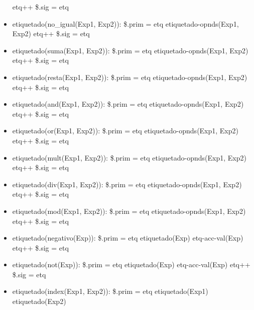 \documentclass[11pt]{article}
\begin{document}
\begin{itemize}
            \subitem etq++
            \subitem \$.sig = etq
        \item etiquetado(no\_igual(Exp1, Exp2)): 
            \subitem \$.prim = etq
            \subitem etiquetado-opnds(Exp1, Exp2)
            \subitem etq++
            \subitem \$.sig = etq
        \item etiquetado(suma(Exp1, Exp2)): 
            \subitem \$.prim = etq
            \subitem etiquetado-opnds(Exp1, Exp2)
            \subitem etq++
            \subitem \$.sig = etq
        \item etiquetado(resta(Exp1, Exp2)): 
            \subitem \$.prim = etq
            \subitem etiquetado-opnds(Exp1, Exp2)
            \subitem etq++
            \subitem \$.sig = etq
        \item etiquetado(and(Exp1, Exp2)): 
            \subitem \$.prim = etq
            \subitem etiquetado-opnds(Exp1, Exp2)
            \subitem etq++
            \subitem \$.sig = etq
        \item etiquetado(or(Exp1, Exp2)): 
            \subitem \$.prim = etq
            \subitem etiquetado-opnds(Exp1, Exp2)
            \subitem etq++
            \subitem \$.sig = etq
        \item etiquetado(mult(Exp1, Exp2)): 
            \subitem \$.prim = etq
            \subitem etiquetado-opnds(Exp1, Exp2)
            \subitem etq++
            \subitem \$.sig = etq
        \item etiquetado(div(Exp1, Exp2)): 
            \subitem \$.prim = etq
            \subitem etiquetado-opnds(Exp1, Exp2)
            \subitem etq++
            \subitem \$.sig = etq
        \item etiquetado(mod(Exp1, Exp2)): 
            \subitem \$.prim = etq
            \subitem etiquetado-opnds(Exp1, Exp2)
            \subitem etq++
            \subitem \$.sig = etq
        \item etiquetado(negativo(Exp)): 
            \subitem \$.prim = etq
            \subitem etiquetado(Exp)
            \subitem etq-acc-val(Exp)
            \subitem etq++
            \subitem \$.sig = etq
        \item etiquetado(not(Exp)): 
            \subitem \$.prim = etq
            \subitem etiquetado(Exp)
            \subitem etq-acc-val(Exp)
            \subitem etq++
            \subitem \$.sig = etq
        \item etiquetado(index(Exp1, Exp2)): 
            \subitem \$.prim = etq
            \subitem etiquetado(Exp1)
            \subitem etiquetado(Exp2)

\end{itemize}
\end{document}
